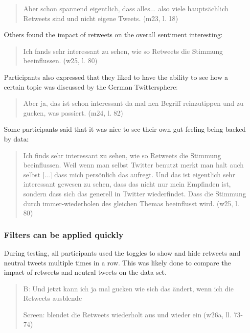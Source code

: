 \begin{quote}
    Aber schon spannend eigentlich, dass alles... also viele hauptsächlich Retweets sind und nicht eigene Tweets. (m23, l. 18)
\end{quote}

Others found the impact of retweets on the overall sentiment interesting:

\begin{quote}
    Ich fands sehr interessant zu sehen, wie so Retweets die Stimmung beeinflussen. (w25, l. 80)
\end{quote}

Participants also expressed that they liked to have the ability to see how a certain topic was discussed by the German Twittersphere:

\begin{quote}
    Aber ja, das ist schon interessant da mal nen Begriff reinzutippen und zu gucken, was passiert. (m24, l. 82)
\end{quote}

Some participants said that it was nice to see their own gut-feeling being backed by data:

\begin{quote}
    Ich finds sehr interessant zu sehen, wie so Retweets die Stimmung beeinflussen. Weil wenn man selbst Twitter benutzt merkt man halt auch selbst [...] dass mich persönlich das aufregt. Und das ist eigentlich sehr interessant gewesen zu sehen, dass das nicht nur mein Empfinden ist, sondern dass sich das generell in Twitter wiederfindet. Dass die Stimmung durch immer-wiederholen des gleichen Themas beeinflusst wird. (w25, l. 80)
\end{quote}

\subsubsection*{Filters can be applied quickly}
During testing, all participants used the toggles to show and hide retweets and neutral tweets multiple times in a row. This was likely done to compare the impact of retweets and neutral tweets on the data set.

\begin{quote}
    B: Und jetzt kann ich ja mal gucken wie sich das ändert, wenn ich die Retweets ausblende

    Screen: blendet die Retweets wiederholt aus und wieder ein (w26a, ll. 73-74)
\end{quote}

